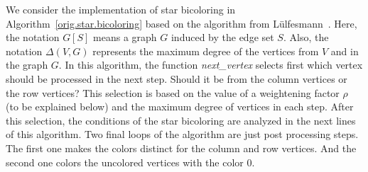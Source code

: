 \documentclass[12pt, twoside,a4paper,toc=bibliography]{scrbook}
\newcommand{\coderef}[1]{Algorithm~\protect\ref{#1}}
\begin{document}
We consider the implementation of star bicoloring in \coderef{orig.star.bicoloring} based on
the algorithm from Lülfesmann~\cite{Lulfesmann2012Fap}.
Here, the notation $G[S]$ means a graph $G$ induced by the edge set $S$.
Also, the notation $\Delta(V,G)$ represents the maximum degree of the vertices from $V$ and in the graph $G$. 
In this algorithm, the function \textit{next\_vertex} selects first which vertex should be processed in the next step.
Should it be from the column vertices or the row vertices?
This selection is based on the value of a weightening factor $\rho$ (to be explained below)
and the maximum degree of vertices in each step.
After this selection, the conditions of the star bicoloring are analyzed in the next lines of this algorithm.
Two final loops of the algorithm are just post processing steps. The first one makes the colors distinct for the column and
row vertices. And the second one colors the uncolored vertices with the color $0$.
\end{document}
